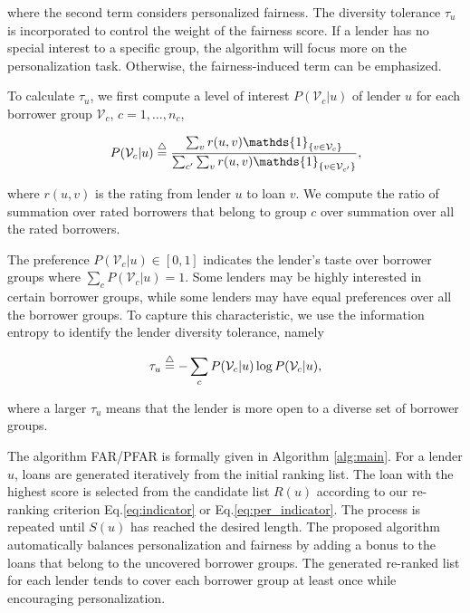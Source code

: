 where the second term considers personalized fairness. The diversity tolerance $\tau_u$ is incorporated to control the weight of the fairness score. If a lender has no special interest to a specific group, the algorithm will focus more on the personalization task. Otherwise, the fairness-induced term can be emphasized.


To calculate $\tau_u$, we first compute a level of interest $P(\mathcal V_c|u)$ of lender $u$ for each borrower group $\mathcal V_c$, $c=1,\ldots,n_c$,

\begin{equation}
P(\mathcal V_c|u)\buildrel\triangle\over=\frac{\sum_vr(u,v)\mathds{1}_{\{v\in \mathcal V_c\}}}{\sum_{c'}\sum_vr(u,v)\mathds{1}_{\{v\in \mathcal V_{c'}\}}},
\end{equation}

where $r(u,v)$ is the rating from lender $u$ to loan $v$. We compute the ratio of summation over rated borrowers that belong to group $c$ over summation over all the rated borrowers. 

The preference $P(\mathcal V_c|u)\in [0,1]$ indicates the lender's taste over borrower groups where $\sum_{c} P(\mathcal V_c|u)=1$. Some lenders may be highly interested in certain borrower groups, while some lenders may have equal preferences over all the borrower groups. To capture this characteristic, we use the information entropy \cite{shannon2001mathematical} to identify the lender diversity tolerance, namely

\begin{equation}
\tau_u\buildrel\triangle\over=-\sum_{c}P(\mathcal V_c|u)\log P(\mathcal V_c|u),
\end{equation}

where a larger $\tau_u$ means that the lender is more open to a diverse set of borrower groups.

The algorithm FAR/PFAR is formally given in Algorithm \ref{alg:main}. For a lender $u$, loans are generated iteratively from the initial ranking list. The loan with the highest score is selected from the candidate list $R(u)$ according to our re-ranking criterion Eq.\eqref{eq:indicator} or Eq.\eqref{eq:per_indicator}. The process is repeated until $S(u)$ has reached the desired length. The proposed algorithm automatically balances personalization and fairness by adding a bonus to the loans that belong to the uncovered borrower groups. The generated re-ranked list for each lender tends to cover each borrower group at least once while encouraging personalization.

